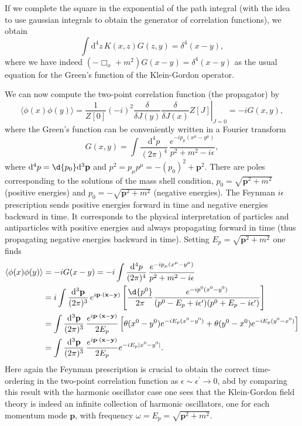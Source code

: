 If we complete the square in the exponential of the path integral (with the idea to use gaussian integrals to obtain the generator of correlation functions), we obtain
\[
    \int \mathrm{d}^4 z \, K(x,z) G(z,y) = \delta^4(x-y),
\]
where we have indeed \(\left(-\Box_x + m^2 \right) G(x-y) = \delta^4(x-y)\) as the usual equation for the Green's function of the Klein-Gordon operator.

We can now compute the two-point correlation function (the propagator) by
\[
    \langle \phi(x) \phi(y) \rangle = \left. \frac{1}{Z[0]} \left(-i\right)^2 \frac{\delta}{\delta J(y)} \frac{\delta}{\delta J(x)} Z[J] \right|_{J=0} = -i G(x,y),
\]
where the Green's function can be conveniently written in a Fourier transform
\[
    G(x,y) = \int \frac{\mathrm{d}^4 p}{(2\pi)^4} \, \frac{e^{-ip_\mu (x^{\mu} - y^{\mu})}}{p^2 + m^2 - i \epsilon},
\]
where \(\mathrm{d}^4 p = \d{p_0}\mathrm{d}^3 \mathbf{p}\) and \(p^2 = p_\mu p^{\mu} = -(p_0)^2 + \mathbf{p}^2\). There are poles corresponding to the solutions of the mass shell condition, \(p_0 = \sqrt{\mathbf{p}^2 + m^2}\) (positive energies) and \(p_0 = -\sqrt{\mathbf{p}^2 + m^2}\) (negative energies). The Feynman \(i \epsilon\) prescription sends positive energies forward in time and negative energies backward in time. It corresponds to the physical interpretation of particles and antiparticles with positive energies and always propagating forward in time (thus propagating negative energies backward in time). Setting \(E_p = \sqrt{\mathbf{p}^2 + m^2}\) one finds
\[
    \begin{aligned}
        \langle \phi(x) \phi(y) \rangle & = -i G(x-y) = -i \int \frac{\mathrm{d}^4 p}{(2\pi)^4} \, \frac{e^{-ip_\mu (x^{\mu} - y^{\mu})}}{p^2 + m^2 - i \epsilon}                                                                                                                  \\
                                        & = i \int \frac{\mathrm{d}^3 \mathbf{p}}{(2\pi)^3} \, e^{i \mathbf{p} \cdot (\mathbf{x} - \mathbf{y})}\left[ \frac{\d{p^0}}{2\pi} \frac{e^{-ip^0 (x^0 - y^0)}}{(p^0 - E_p + i\epsilon^{\prime} )(p^0 + E_p - i\epsilon^{\prime})} \right] \\
                                        & = \int \frac{\mathrm{d}^3 \mathbf{p}}{(2\pi)^3} \, \frac{e^{i \mathbf{p} \cdot (\mathbf{x} - \mathbf{y})}}{2 E_p} \left[ \theta(x^0 - y^0) e^{-i E_p (x^0 - y^0)} + \theta(y^0 - x^0) e^{-i E_p (y^0 - x^0)} \right]                     \\
                                        & = \int \frac{\mathrm{d}^3 \mathbf{p}}{(2\pi)^3} \, \frac{e^{i \mathbf{p} \cdot (\mathbf{x} - \mathbf{y})}}{2 E_p} e^{-i E_p \vert x^0 - y^0 \vert}.
    \end{aligned}
\]
Here again the Feynman prescription is crucial to obtain the correct time-ordering in the two-point correlation function as \(\epsilon \sim \epsilon^{\prime} \to 0\), abd by comparing this result with the harmonic oscillator case one sees that the Klein-Gordon field theory is indeed an infinite collection of harmonic oscillators, one for each momentum mode \(\mathbf{p}\), with frequency \(\omega = E_p = \sqrt{\mathbf{p}^2 + m^2}\).

